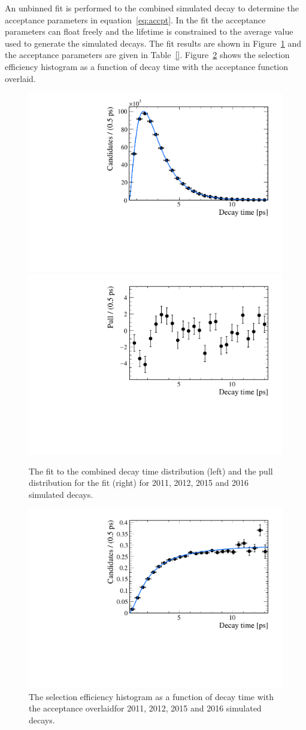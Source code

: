 {\begin{table}[ht]
\end{table}
An unbinned \ml fit is performed to the combined simulated \bsmumu decay to determine the acceptance parameters in equation~\ref{eq:accpt}. In the fit the acceptance parameters can float freely and the \bsmumu lifetime is constrained to the average value used to generate the simulated decays. The fit results are shown in Figure~\ref{fig:accptfit} and the acceptance parameters are given in Table~\ref{}. Figure~\ref{fig:accptplot} shows the selection efficiency histogram as a function of decay time with the acceptance function overlaid.




\begin{figure}[htbp]
    \centering
        \includegraphics[width= 0.49 \textwidth]{./Figs/LifetimeMeasurement/Bs2MuMu_Acceptance_fit.pdf}
        \includegraphics[width= 0.49 \textwidth]{./Figs/LifetimeMeasurement/Bs2MuMu_Accetpance_pull.pdf}
    \caption{The \ml fit to the combined decay time distribution (left) and the pull distribution for the fit (right) for 2011, 2012, 2015 and 2016 simulated \bsmumu decays. }
    \label{fig:accptfit}
\end{figure}


\begin{figure}[htbp]
    \centering
        \includegraphics[width= 0.6 \textwidth]{./Figs/LifetimeMeasurement/Bs2MuMu_Acceptance_plot.pdf}
    \caption{The selection efficiency histogram as a function of decay time with the acceptance \pdf overlaidfor 2011, 2012, 2015 and 2016 simulated \bsmumu decays. }
    \label{fig:accptplot}
\end{figure}


}
